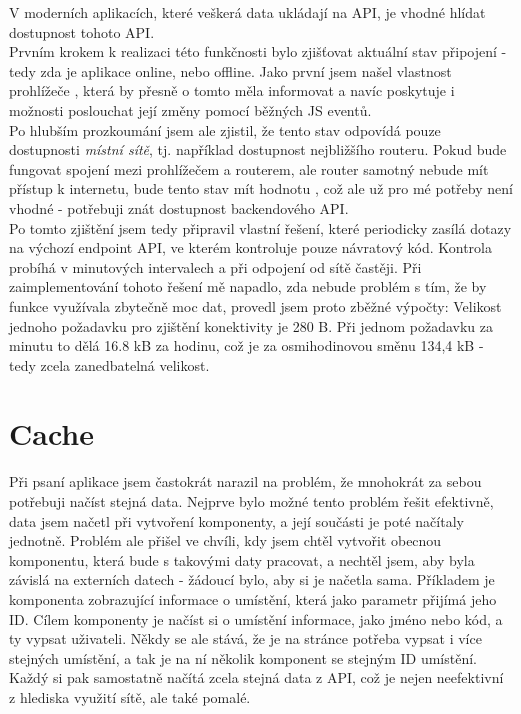 V moderních aplikacích, které veškerá data ukládají na API, je vhodné hlídat dostupnost tohoto API.\\
Prvním krokem k realizaci této funkčnosti bylo zjišťovat aktuální stav připojení - tedy zda je aplikace online, nebo offline. Jako první jsem našel vlastnost prohlížeče  \cite{online}, která by přesně o tomto měla informovat a navíc poskytuje i možnosti poslouchat její změny pomocí běžných JS eventů.\\
Po hlubším prozkoumání jsem ale zjistil, že tento stav odpovídá pouze dostupnosti \emph{místní sítě}, tj. například dostupnost nejbližšího routeru. Pokud bude fungovat spojení mezi prohlížečem a routerem, ale router samotný nebude mít přístup k internetu, bude tento stav mít hodnotu , což ale už pro mé potřeby není vhodné - potřebuji znát dostupnost backendového API.\\
Po tomto zjištění jsem tedy připravil vlastní řešení, které periodicky zasílá dotazy na výchozí endpoint API, ve kterém kontroluje pouze návratový kód. Kontrola probíhá v minutových intervalech a při odpojení od sítě častěji. Při zaimplementování tohoto řešení mě napadlo, zda nebude problém s tím, že by funkce využívala zbytečně moc dat, provedl jsem proto zběžné výpočty: Velikost jednoho požadavku pro zjištění konektivity je 280 B. Při jednom požadavku za minutu to dělá 16.8 kB za hodinu, což je za osmihodinovou směnu 134,4 kB - tedy zcela zanedbatelná velikost.


\section{Cache} \label{impl:cache}

Při psaní aplikace jsem častokrát narazil na problém, že mnohokrát za sebou potřebuji načíst stejná data. Nejprve bylo možné tento problém řešit efektivně, data jsem načetl při vytvoření komponenty, a její součásti je poté načítaly jednotně. Problém ale přišel ve chvíli, kdy jsem chtěl vytvořit obecnou komponentu, která bude s takovými daty pracovat, a nechtěl jsem, aby byla závislá na externích datech - žádoucí bylo, aby si je načetla sama. Příkladem je komponenta zobrazující informace o umístění, která jako parametr přijímá jeho ID. Cílem komponenty je načíst si o umístění informace, jako jméno nebo kód, a ty vypsat uživateli. Někdy se ale stává, že je na stránce potřeba vypsat i více stejných umístění, a tak je na ní několik komponent se stejným ID umístění. Každý si pak samostatně načítá zcela stejná data z API, což je nejen neefektivní z hlediska využití sítě, ale také pomalé.\\

